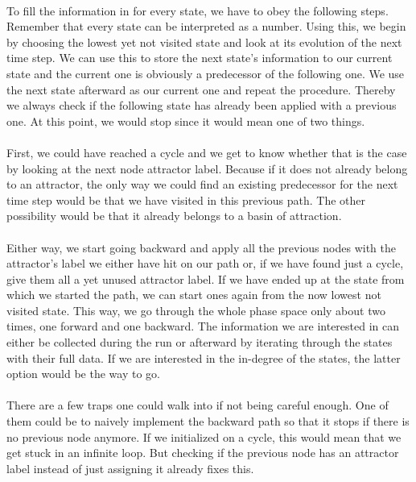 \paragraph*{}
To fill the information in for every state, we have to obey the following steps. Remember that every state can be interpreted as a number. Using this, we begin by choosing the lowest yet not visited state and look at its evolution of the next time step. We can use this to store the next state's information to our current state and the current one is obviously a predecessor of the following one. We use the next state afterward as our current one and repeat the procedure. Thereby we always check if the following state has already been applied with a previous one. At this point, we would stop since it would mean one of two things.

\paragraph*{}
First, we could have reached a cycle and we get to know whether that is the case by looking at the next node attractor label. Because if it does not already belong to an attractor, the only way we could find an existing predecessor for the next time step would be that we have visited in this previous path. The other possibility would be that it already belongs to a basin of attraction.

\paragraph*{}
Either way, we start going backward and apply all the previous nodes with the attractor's label we either have hit on our path or, if we have found just a cycle, give them all a yet unused attractor label. If we have ended up at the state from which we started the path, we can start ones again from the now lowest not visited state. This way, we go through the whole phase space only about two times, one forward and one backward. The information we are interested in can either be collected during the run or afterward by iterating through the states with their full data. If we are interested in the in-degree of the states, the latter option would be the way to go.

\paragraph*{}
There are a few traps one could walk into if not being careful enough. One of them could be to naively implement the backward path so that it stops if there is no previous node anymore. If we initialized on a cycle, this would mean that we get stuck in an infinite loop. But checking if the previous node has an attractor label instead of just assigning it already fixes this.

